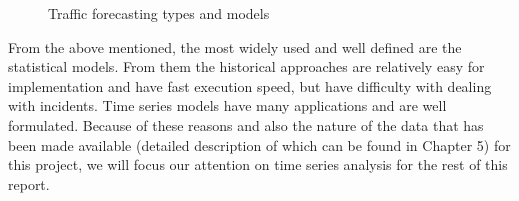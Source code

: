 \begin{figure}[ht]
	\caption{Traffic forecasting types and models \cite{youKim}}
	\label{fig:modelsProsCons}
\end{figure}

From the above mentioned, the most widely used and well defined are the statistical models. From them the historical approaches are relatively easy for implementation and have fast execution speed, but have difficulty with dealing with incidents. Time series models have many applications and are well formulated. Because of these reasons and also the nature of the data that has been made available (detailed description of which can be found in Chapter 5) for this project, we will focus our attention on time series analysis for the rest of this report.

